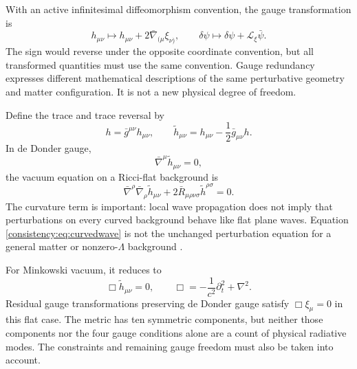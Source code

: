 \documentclass[11pt,oneside]{report}
\theoremstyle{remark}
\numberwithin{definition}{chapter}
\numberwithin{proposition}{chapter}
\numberwithin{remark}{chapter}
\begin{document}
With an active infinitesimal diffeomorphism convention, the gauge transformation is
\begin{equation}
h_{\mu\nu}\longmapsto h_{\mu\nu}+2\bar\nabla_{(\mu}\xi_{\nu)},
\qquad \delta\psi\longmapsto\delta\psi+\mathcal L_\xi\bar\psi.
\label{consistency:eq:gaugetransform}
\end{equation}
The sign would reverse under the opposite coordinate convention, but all transformed quantities must use the same convention. Gauge redundancy expresses different mathematical descriptions of the same perturbative geometry and matter configuration. It is not a new physical degree of freedom.

Define the trace and trace reversal by
\begin{equation}
h=\bar g^{\mu\nu}h_{\mu\nu},\qquad
\widetilde h_{\mu\nu}=h_{\mu\nu}-\frac12\bar g_{\mu\nu}h.
\label{consistency:eq:tracereverse}
\end{equation}
In de Donder gauge,
\begin{equation}
\bar\nabla^\mu\widetilde h_{\mu\nu}=0,
\label{consistency:eq:dedonder}
\end{equation}
the vacuum equation on a Ricci-flat background is
\begin{equation}
\bar\nabla^\rho\bar\nabla_\rho\widetilde h_{\mu\nu}
+2\bar R_{\mu\rho\nu\sigma}\widetilde h^{\rho\sigma}=0.
\label{consistency:eq:curvedwave}
\end{equation}
The curvature term is important: local wave propagation does not imply that perturbations on every curved background behave like flat plane waves. Equation \eqref{consistency:eq:curvedwave} is not the unchanged perturbation equation for a general matter or nonzero-$\Lambda$ background \parencite{Carroll1997,Gourgoulhon2007}.

For Minkowski vacuum, it reduces to
\begin{equation}
\Box\widetilde h_{\mu\nu}=0,\qquad
\Box=-\frac{1}{c^2}\partial_t^2+\nabla^2.
\label{consistency:eq:minkwave}
\end{equation}
Residual gauge transformations preserving de Donder gauge satisfy $\Box\xi_\mu=0$ in this flat case. The metric has ten symmetric components, but neither those components nor the four gauge conditions alone are a count of physical radiative modes. The constraints and remaining gauge freedom must also be taken into account.
\end{document}
